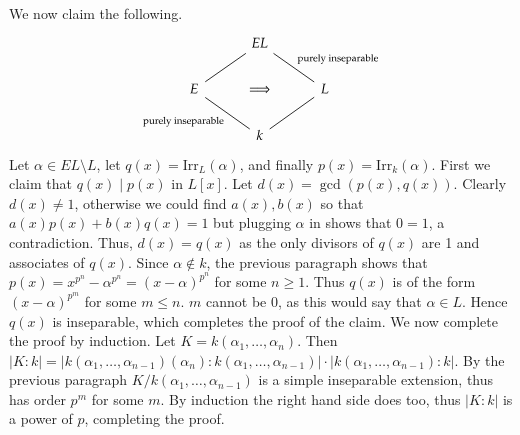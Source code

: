 \documentclass[12pt]{article}
\theoremstyle{definitionstyle}
\begin{document}
\begin{enumerate}[leftmargin=\labelsep]
\begin{enumerate}[label=(\arabic*)]
			We now claim the following.
			\[\begin{tikzcd}
				& EL \\
				E & \implies & L \\
				& k
				\arrow[no head, from=3-2, to=2-3]
				\arrow["{\text{purely inseparable}}", no head, from=1-2, to=2-3]
				\arrow["{\text{purely inseparable}}"', no head, from=2-1, to=3-2]
				\arrow[no head, from=2-1, to=1-2]
			\end{tikzcd}\]
			Let $\alpha \in EL \setminus L$, let $q(x) = \mathrm{Irr}_L(\alpha)$, and finally $p(x) = \mathrm{Irr}_k(\alpha)$. First we claim that $q(x) \mid p(x)$ in $L[x]$. Let $d(x) = \gcd(p(x), q(x))$. Clearly $d(x) \neq 1$, otherwise we could find $a(x), b(x)$ so that $a(x)p(x) + b(x)q(x) = 1$ but plugging $\alpha$ in shows that $0 = 1$, a contradiction. Thus, $d(x) = q(x)$ as the only divisors of $q(x)$ are 1 and associates of $q(x)$. Since $\alpha \not \in k$, the previous paragraph shows that $p(x) = x^{p^n} - \alpha^{p^n} = (x-\alpha)^{p^n}$ for some $n \geq 1$. Thus $q(x)$ is of the form $ (x-\alpha)^{p^m}$ for some $m \leq n$. $m$ cannot be 0, as this would say that $\alpha \in L$. Hence $q(x)$ is inseparable, which completes the proof of the claim. We now complete the proof by induction. Let $K = k(\alpha_1, \ldots, \alpha_n)$. Then $|K:k| = |k(\alpha_1, \ldots, \alpha_{n-1})(\alpha_n) : k(\alpha_1, \ldots, \alpha_{n-1})| \cdot |k(\alpha_1, \ldots, \alpha_{n-1}) : k|$. By the previous paragraph $K/k(\alpha_1, \ldots, \alpha_{n-1})$ is a simple inseparable extension, thus has order $p^m$ for some $m$. By induction the right hand side does too, thus $|K:k|$ is a power of $p$, completing the proof.
			

\end{enumerate}
\end{enumerate}
\end{document}
